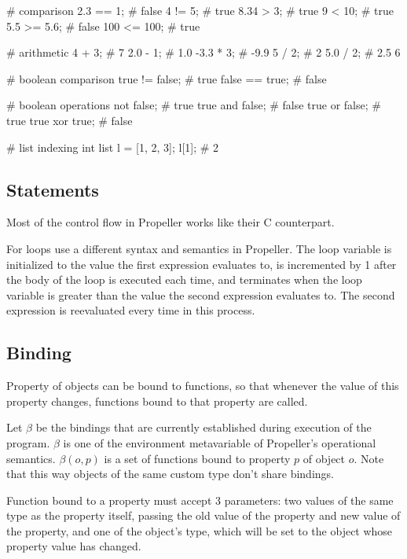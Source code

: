 \begin{mylistingn}
# comparison
2.3 == 1;   # false
4 != 5;     # true
8.34 > 3;   # true
9 < 10;     # true
5.5 >= 5.6; # false
100 <= 100; # true

# arithmetic
4 + 3;    # 7
2.0 - 1;  # 1.0
-3.3 * 3; # -9.9
5 / 2;    # 2
5.0 / 2;  # 2.5
6 %

# boolean comparison
true != false; # true
false == true; # false

# boolean operations
not false;      # true
true and false; # false
true or false;  # true
true xor true;  # false
\end{mylistingn}

\begin{mylistingn}
# list indexing
int list l = [1, 2, 3];
l[1];           # 2
\end{mylistingn}

\subsection{Statements}

Most of the control flow in Propeller works like their C counterpart.

For loops use a different syntax and semantics in Propeller. The loop variable is initialized to the
value the first expression evaluates to, is incremented by 1 after the body of the loop is executed
each time, and terminates when the loop variable is greater than the value the second expression
evaluates to. The second expression is reevaluated every time in this process.

\subsection{Binding}

Property of objects can be bound to functions, so that whenever the value of this property
changes, functions bound to that property are called.

Let $\beta$ be the bindings that are currently established during execution of the program. $\beta$
is one of the environment metavariable of Propeller's operational semantics.
$\beta(o, p)$ is a set of functions bound to property $p$ of object $o$. Note that this way objects
of the same custom type don't share bindings.

Function bound to a property must accept 3 parameters: two values of the same type as the property
itself, passing the old value of the property and new value of the property, and one of the object's
type, which will be set to the object whose property value has changed.

